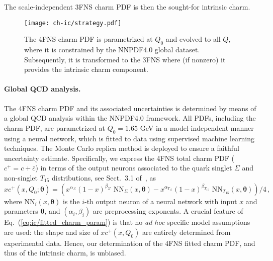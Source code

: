 The scale-independent 3FNS charm PDF is then the sought-for intrinsic
charm.

\begin{figure}[h]
\begin{center}
  \texttt{[image: ch-ic/strategy.pdf]}
 \end{center}
\vspace{-0.2cm}
\caption{The 4FNS charm PDF is parametrized  at $Q_0$
  and evolved to all  $Q$, where it is  constrained by the NNPDF4.0
  global dataset. 
 Subsequently, it is transformed to the 3FNS where (if nonzero) it
 provides the intrinsic charm component.
  \label{fig:ic/strategy}
}
\end{figure}

\paragraph{Global QCD analysis.}
%
The 4FNS charm PDF and its associated
uncertainties is determined by means of a global QCD analysis
within the NNPDF4.0 framework.
%
All PDFs, including the charm PDF, are  parametrized at $Q_0=1.65$ GeV in 
a model-independent manner using a neural network, which is fitted to data using 
supervised machine learning techniques.
The Monte Carlo replica method
is deployed to ensure a faithful uncertainty estimate.
%
Specifically, we express the 4FNS total charm PDF ($c^+=c+\bar{c}$)  in terms of the output neurons associated to the quark singlet $\Sigma$ and non-singlet $T_{15}$
distributions, see Sect.~3.1 of~\cite{Ball:2021leu}, as
\begin{equation}
\label{eq:ic/fitted_charm_param}
xc^+(x,Q_0;{\boldsymbol \theta}) =
\left( x^{\alpha_{\Sigma}}(1-x)^{\beta_{\Sigma}} \textrm{ NN}_{\Sigma}(x,{\boldsymbol \theta})-
x^{\alpha_{T_{15}}}(1-x)^{\beta_{T_{15}}} \textrm{ NN}_{T_{15}}(x,{\boldsymbol \theta})
\right)/4 \, ,
\end{equation}
where $\textrm{NN}_{i}(x,{\boldsymbol \theta})$ is the $i$-th output neuron of
a neural network with input $x$ and  parameters ${\boldsymbol \theta}$, and 
$\left(\alpha_i,\beta_i\right)$ are preprocessing exponents.
%
A crucial feature of Eq.~(\ref{eq:ic/fitted_charm_param}) is that no \textit{
ad hoc} specific model assumptions are used: the shape and size of
$xc^+(x,Q_0)$ are entirely determined from experimental data.
%
Hence, our determination of the 4FNS fitted charm PDF, and thus of the intrinsic charm, is unbiased.
%

